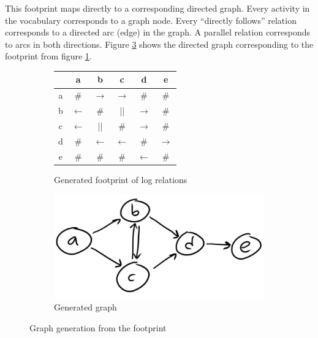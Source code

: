 This footprint maps directly to a corresponding directed graph.
Every activity in the vocabulary corresponds to a graph node.
Every ``directly follows'' relation corresponds to a directed arc (edge) in the graph. A parallel relation corresponds to arcs in both directions.
Figure \ref{fig:examplegraph} shows the directed graph corresponding to the footprint from figure \ref{tab:examplefootprint}.

\begin{figure}
    \centering
    \begin{subfigure}[h]{0.4\linewidth}
        \begin{center}
        \begin{tabular}{cccccc}
        \hline
          & a & b & c & d & e\\
        \hline
        a & \# & $\rightarrow$ & $\rightarrow$ & \# & \# \\
        b & $\leftarrow$ & \# & || & $\rightarrow$ & \# \\
        c & $\leftarrow$ & || & \# & $\rightarrow$ & \# \\
        d & \# & $\leftarrow$ & $\leftarrow$ & \# & $\rightarrow$ \\
        e & \# & \# & \# & $\leftarrow$ & \# \\
        \hline
        \end{tabular}
        \end{center}
        \caption{Generated footprint of log relations}
        \label{tab:examplefootprint}
    \end{subfigure}
    \begin{subfigure}[h]{0.4\linewidth}
        \centering \includegraphics[width=\linewidth]{gfx/figures/graphthing.jpg}
        \caption{Generated graph}
        \label{fig:examplegraph}
    \end{subfigure}
    \caption{Graph generation from the footprint}
\end{figure}

